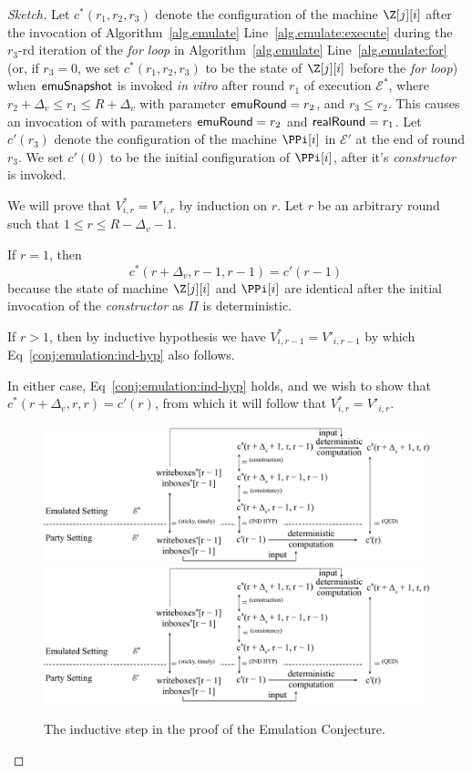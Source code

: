 \begin{proof}[Sketch]
  Let $c^*(r_1, r_2, r_3)$ denote the configuration
  of the machine $\Z[j][i]$ after the invocation of
  Algorithm~\ref{alg.emulate} Line~\ref{alg.emulate:execute}
  during the $r_3$-rd iteration of the \emph{for loop} in
  Algorithm~\ref{alg.emulate} Line~\ref{alg.emulate:for}
  (or, if $r_3 = 0$, we set $c^*(r_1, r_2, r_3)$ to be the state of
  $\Z[j][i]$ before the \emph{for loop})
  when $\textsf{emuSnapshot}$ is
  invoked \emph{in vitro} after round $r_1$ of execution $\mathcal{E}^*$,
  where $r_2 + \Delta_v \leq r_1 \leq R + \Delta_v$ with parameter
  $\textsf{emuRound} = r_2$, and $r_3 \leq r_2$.
  This causes an invocation of \emulate with parameters
  $\textsf{emuRound} = r_2$ and $\textsf{realRound} = r_1$.
  Let $c'(r_3)$ denote the configuration of the machine $\PPi[i]$
  in $\mathcal{E}'$ at the end of round $r_3$.
  We set $c'(0)$ to be the initial configuration of $\PPi[i]$,
  after it's \emph{constructor} is invoked.

  We will prove that $V^*_{i,r} = V'_{i,r}$ by induction on $r$.
  Let $r$ be an arbitrary round such that $1 \leq r \leq R - \Delta_v - 1$.

  If $r = 1$, then
  \begin{equation}\label{conj:emulation:ind-hyp}
    c^*(r + \Delta_v, r - 1, r - 1) = c'(r - 1)\,
  \end{equation}
  because the state of machine $\Z[j][i]$ and $\PPi[i]$ are identical
  after the initial invocation of the \emph{constructor} as $\Pi$
  is deterministic.

  If $r > 1$, then by inductive hypothesis we have $V^*_{i,r - 1} = V'_{i,r - 1}$
  by which Eq~\ref{conj:emulation:ind-hyp} also follows.

  In either case, Eq~\ref{conj:emulation:ind-hyp} holds, and we
  wish to show that $c^*(r + \Delta_v, r, r) = c'(r)$,
  from which it will follow that $V^*_{i,r} = V'_{i,r}$.

  \begin{figure}
    \centering
    \iftwocolumn
    \includegraphics[width=0.6 \textwidth,keepaspectratio]{figures/emulation-claim-1-induction.pdf}
    \else
    \includegraphics[width=\textwidth,keepaspectratio]{figures/emulation-claim-1-induction.pdf}
    \fi
    \caption{The inductive step in the proof of the Emulation Conjecture.}
    \label{fig.emulation-claim-1-induction}
  \end{figure}


\end{proof}

